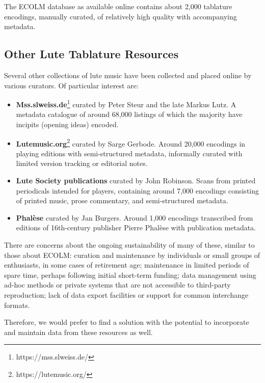 \documentclass[sigconf, nonacm=true]{acmart}
\begin{document}
\begin{sloppypar}
  The ECOLM database as available online contains about 2,000
  tablature encodings, manually curated, of relatively high quality
  with accompanying metadata.

  \subsection{Other Lute Tablature Resources}

  Several other collections of lute music have been collected and
  placed online by various curators. Of particular interest are:
  \begin{itemize}
    \item {\bf Mss.slweiss.de}\footnote{https://mss.slweiss.de/}
      curated by Peter Steur and the late Markus Lutz. A metadata
      catalogue of around 68,000 listings of which the majority have
      incipits (opening ideas) encoded.
    \item {\bf Lutemusic.org}\footnote{https://lutemusic.org/} curated
      by Sarge Gerbode. Around 20,000 encodings in playing editions
      with semi-structured metadata, informally curated with limited
      version tracking or editorial notes.
    \item {\bf Lute Society publications} curated by John
      Robinson. Scans from printed periodicals intended for players,
      containing around 7,000 encodings consisting of printed music,
      prose commentary, and semi-structured metadata.
    \item {\bf Phal\`ese} curated by Jan Burgers. Around 1,000
      encodings transcribed from editions of 16th-century publisher
      Pierre Phal\`ese with publication metadata.

  \end{itemize}

  There are concerns about the ongoing sustainability of many of
  these, similar to those about ECOLM: curation and maintenance by
  individuals or small groups of enthusiasts, in some cases of
  retirement age; maintenance in limited periods of spare time,
  perhaps following initial short-term funding; data management using
  ad-hoc methods or private systems that are not accessible to
  third-party reproduction; lack of data export facilities or support
  for common interchange formats.

  Therefore, we would prefer to find a solution with the potential to
  incorporate and maintain data from these resources as well.


\end{sloppypar}
\end{document}
